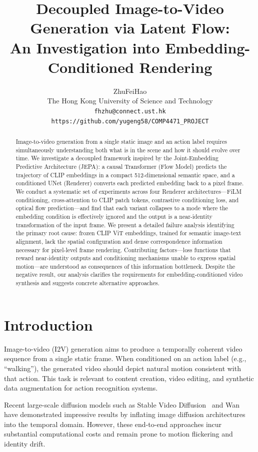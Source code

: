 \documentclass[10pt,twocolumn,letterpaper]{article}
\title{Decoupled Image-to-Video Generation via Latent Flow:\\An Investigation into Embedding-Conditioned Rendering}
\author{ZhuFeiHao \quad 20949355\\
The Hong Kong University of Science and Technology\\
{\tt\small fhzhu@connect.ust.hk}\\
{\tt\small https://github.com/yugeng58/COMP4471\_PROJECT}}
\begin{document}
\maketitle

\begin{abstract}
Image-to-video generation from a single static image and an action label
requires simultaneously understanding both what is in the scene and how it should
evolve over time. We investigate a decoupled framework inspired by the
Joint-Embedding Predictive Architecture (JEPA): a causal Transformer (Flow Model)
predicts the trajectory of CLIP embeddings in a compact 512-dimensional semantic
space, and a conditioned UNet (Renderer) converts each predicted embedding back
to a pixel frame. We conduct a systematic set of experiments across four Renderer
architectures---FiLM conditioning, cross-attention to CLIP patch tokens,
contrastive conditioning loss, and optical flow prediction---and find that each
variant collapses to a mode where the embedding condition is effectively ignored
and the output is a near-identity transformation of the input frame. We present a
detailed failure analysis identifying the primary root cause: frozen CLIP ViT
embeddings, trained for semantic image-text alignment, lack the spatial
configuration and dense correspondence information necessary for pixel-level
frame rendering. Contributing factors---loss functions that reward near-identity
outputs and conditioning mechanisms unable to express spatial motion---are
understood as consequences of this information bottleneck. Despite the negative
result, our analysis clarifies the requirements for embedding-conditioned video
synthesis and suggests concrete alternative approaches.
\end{abstract}

\section{Introduction}

Image-to-video (I2V) generation aims to produce a temporally coherent video
sequence from a single static frame. When conditioned on an action label
(e.g., ``walking''), the generated video should depict natural motion consistent
with that action. This task is relevant to content creation, video editing, and
synthetic data augmentation for action recognition systems.

Recent large-scale diffusion models such as Stable Video
Diffusion~\cite{blat2023} and Wan~\cite{wan2025} have demonstrated impressive
results by inflating image diffusion architectures into the temporal domain.
However, these end-to-end approaches incur substantial computational costs
and remain prone to motion flickering and identity drift.
\end{document}

